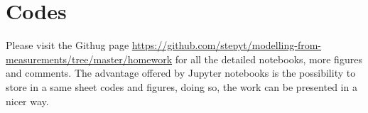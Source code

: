 \documentclass[]{article}
\begin{document}
\appendix
\section{Codes}
Please visit the Githug page \url{https://github.com/stepyt/modelling-from-measurements/tree/master/homework} for all the detailed notebooks, more figures and comments. The advantage offered by Jupyter notebooks is the possibility to store in a same sheet codes and figures, doing so, the work can be presented in a nicer way.
\end{document}

